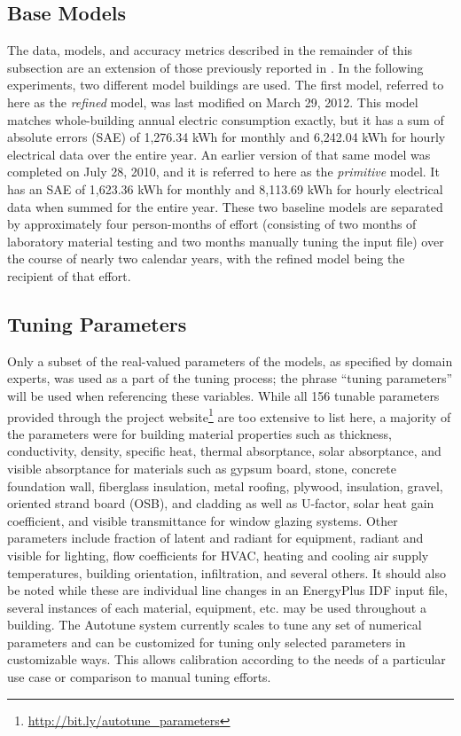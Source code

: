 \documentclass[preprint, review, 12pt]{elsarticle}
\begin{document}
\subsection{Base Models}
The data, models, and accuracy metrics described in the remainder of this subsection are an extension of those previously reported in \cite{cit:garrett2013}. In the following experiments, two different model buildings are used. The first model, referred to here as the \emph{refined} model, was last modified on March 29, 2012. This model matches whole-building annual electric consumption exactly, but it has a sum of absolute errors (SAE) of 1,276.34 kWh for monthly and 6,242.04 kWh for hourly electrical data over the entire year. An earlier version of that same model was completed on July 28, 2010, and it is referred to here as the \emph{primitive} model. It has an SAE of 1,623.36 kWh for monthly and 8,113.69 kWh for hourly electrical data when summed for the entire year. These two baseline models are separated by approximately four person-months of effort (consisting of two months of laboratory material testing and two months manually tuning the input file) over the course of nearly two calendar years, with the refined model being the recipient of that effort.

\subsection{Tuning Parameters}
Only a subset of the real-valued parameters of the models, as specified by domain experts, was used as a part of the tuning process; the phrase ``tuning parameters'' will be used when referencing these variables. While all 156 tunable parameters provided through the project website\footnote{\url{http://bit.ly/autotune_parameters}} are too extensive to list here, a majority of the parameters were for building material properties such as thickness, conductivity, density, specific heat, thermal absorptance, solar absorptance, and visible absorptance for materials such as gypsum board, stone, concrete foundation wall, fiberglass insulation, metal roofing, plywood, insulation, gravel, oriented strand board (OSB), and cladding as well as U-factor, solar heat gain coefficient, and visible transmittance for window glazing systems. Other parameters include fraction of latent and radiant for equipment, radiant and visible for lighting, flow coefficients for HVAC, heating and cooling air supply temperatures, building orientation, infiltration, and several others. It should also be noted while these are individual line changes in an EnergyPlus IDF input file, several instances of each material, equipment, etc. may be used throughout a building. The Autotune system currently scales to tune any set of numerical parameters and can be customized for tuning only selected parameters in customizable ways. This allows calibration according to the needs of a particular use case or comparison to manual tuning efforts.
\end{document}
